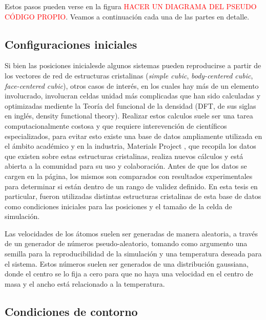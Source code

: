 Estos pasos pueden verse en la figura \textcolor{red}{HACER UN DIAGRAMA DEL PSEUDO 
CÓDIGO PROPIO}. Veamos a continuación cada una de las partes en detalle.

\subsection{Configuraciones iniciales}

Si bien las posiciones inicialesde algunos sistemas pueden reproducirse a partir
de los vectores de red de estructuras cristalinas (\textit{simple cubic}, 
\textit{body-centered cubic}, \textit{face-centered cubic}), otros casos de
interés, en los cuales hay más de un elemento involucrado, involucran celdas 
unidad más complicadas que han sido calculadas y optimizadas mediente la Teoría
del funcional de la densidad (DFT, de sus siglas en inglés, density functional
theory). Realizar estos calculos suele ser una tarea computacionalmente costosa 
y que requiere interevención de científicos especializados, para evitar esto
existe una base de datos ampliamente utilizada en el ámbito académico y en
la industria, Materials Project \cite{materials_project}, que recopila los datos
que existen sobre estas estructuras cristalinas, realiza nuevos cálculos y está 
abierta a la comunidad para su uso y colaboración. Antes de que los datos se
cargen en la página, los mismos son comparados con resultados experimentales 
para determinar si están dentro de un rango de validez definido. En esta tesis
en particular, fueron utilizadas distintas estructuras cristalinas de esta base de
datos como condiciones iniciales para las posiciones y el tamaño de la celda de 
simulación.

Las velocidades de los átomos suelen ser generadas de manera aleatoria, a través
de un generador de números pseudo-aleatorio, tomando como argumento una semilla 
para la reproducibilidad de la simulación y una temperatura deseada para el
sistema. Estos números suelen ser generados de una distribución gaussiana, donde
el centro se lo fija a cero para que no haya una velocidad en el centro de masa
y el ancho está relacionado a la temperatura.

\subsection{Condiciones de contorno}

